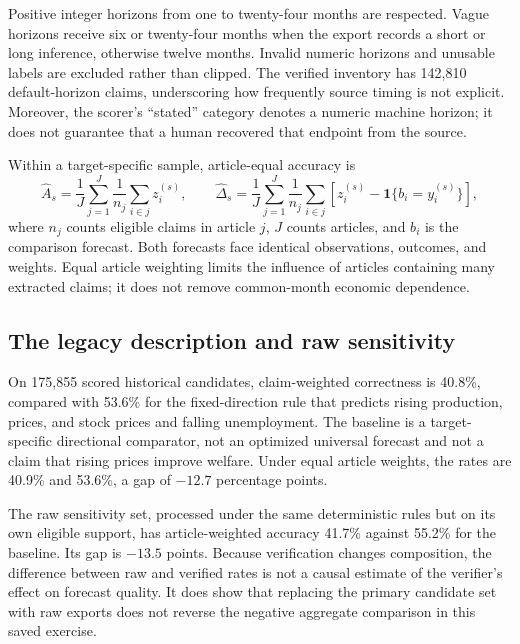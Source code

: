 Positive integer horizons from one to twenty-four months are respected. Vague horizons receive six or twenty-four months when the export records a short or long inference, otherwise twelve months. Invalid numeric horizons and unusable labels are excluded rather than clipped. The verified inventory has 142,810 default-horizon claims, underscoring how frequently source timing is not explicit. Moreover, the scorer's ``stated'' category denotes a numeric machine horizon; it does not guarantee that a human recovered that endpoint from the source.

Within a target-specific sample, article-equal accuracy is
\begin{equation}
 \widehat A_s=\frac{1}{J}\sum_{j=1}^{J}\frac{1}{n_j}
     \sum_{i\in j}z_i^{(s)},\qquad
 \widehat\Delta_s=\frac{1}{J}\sum_{j=1}^{J}\frac{1}{n_j}
     \sum_{i\in j}\left[z_i^{(s)}-\mathbf{1}\{b_i=y_i^{(s)}\}\right],
 \label{eq:paired}
\end{equation}
where $n_j$ counts eligible claims in article $j$, $J$ counts articles, and $b_i$ is the comparison forecast. Both forecasts face identical observations, outcomes, and weights. Equal article weighting limits the influence of articles containing many extracted claims; it does not remove common-month economic dependence.

\subsection{The legacy description and raw sensitivity}
On 175,855 scored historical candidates, claim-weighted correctness is 40.8\%, compared with 53.6\% for the fixed-direction rule that predicts rising production, prices, and stock prices and falling unemployment. The baseline is a target-specific directional comparator, not an optimized universal forecast and not a claim that rising prices improve welfare. Under equal article weights, the rates are 40.9\% and 53.6\%, a gap of $-12.7$ percentage points.

The raw sensitivity set, processed under the same deterministic rules but on its own eligible support, has article-weighted accuracy 41.7\% against 55.2\% for the baseline. Its gap is $-13.5$ points. Because verification changes composition, the difference between raw and verified rates is not a causal estimate of the verifier's effect on forecast quality. It does show that replacing the primary candidate set with raw exports does not reverse the negative aggregate comparison in this saved exercise.

